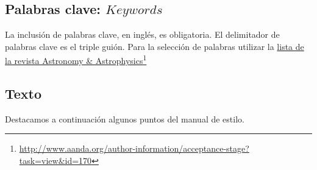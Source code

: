 \documentclass[baaa]{baaa}
\begin{document}
\subsection{Palabras clave: $Keywords$}

La inclusión de palabras clave, en inglés, es obligatoria. El delimitador
de palabras clave es el triple guión. Para la selección de palabras utilizar la 
\href{http://www.aanda.org/author-information/acceptance-stage?task=view&id=170}{lista
de la revista Astronomy \& Astrophysics}\footnote{\url{http://www.aanda.org/author-information/acceptance-stage?task=view&id=170}}


\subsection{Texto}

Destacamos a continuación algunos puntos del manual de estilo.
\end{document}
